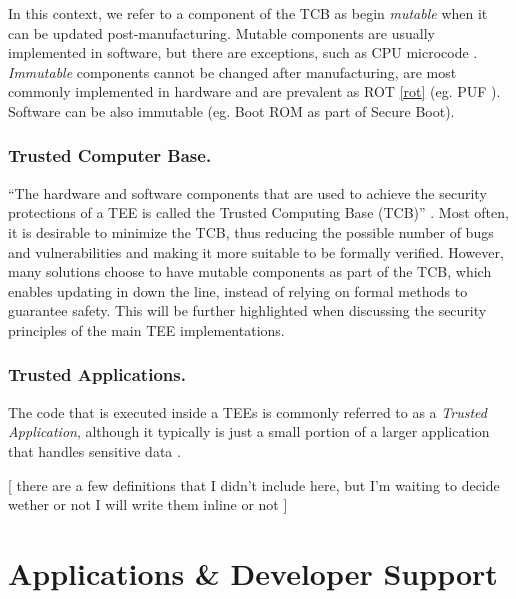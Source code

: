 \documentclass[runningheads,a4paper]{uwsese}
\begin{document}
In this context, we refer to a component of the TCB as begin \emph{mutable}
when it can be updated post-manufacturing. Mutable components are usually
implemented in software, but there are exceptions, such as CPU microcode
\cite{microcode_update}. \emph{Immutable} components cannot be changed after
manufacturing, are most commonly implemented in hardware and are prevalent as
ROT \ref{rot} (eg. PUF \cite{tee_base_article}). Software can be also immutable
(eg. Boot ROM as part of Secure Boot).

\subsubsection{Trusted Computer Base.}

``The hardware and software components that are used to achieve the security
protections of a TEE is called the Trusted Computing Base (TCB)''
\cite{tee_hw_sup}. Most often, it is desirable to minimize the TCB, thus
reducing the possible number of bugs and vulnerabilities and making it more
suitable to be formally verified. However, many solutions choose to have
mutable components as part of the TCB, which enables updating in down the line,
instead of relying on formal methods to guarantee safety. This will be further
highlighted when discussing the security principles of the main TEE
implementations.

\subsubsection{Trusted Applications.}

The code that is executed inside a TEEs is commonly referred to as a
\emph{Trusted Application}, although it typically is just a small portion of a
larger application that handles sensitive data \cite{tee_app_rev}.


[ there are a few definitions that I didn't include here, but I'm waiting to decide wether or not I will write them inline or not ]


\section{Applications \& Developer Support}
\end{document}
